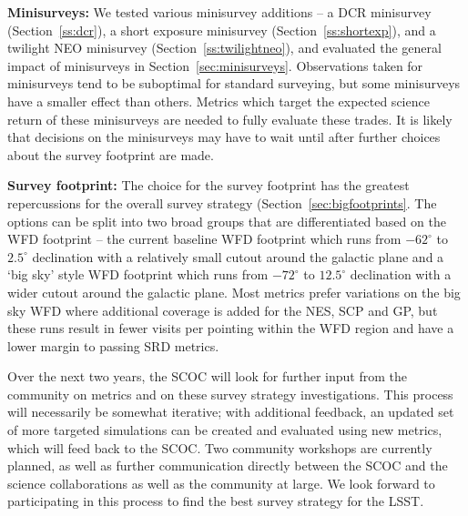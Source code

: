{\bf Minisurveys:} We tested various minisurvey additions -- a DCR minisurvey (Section~\ref{ss:dcr}), a short exposure minisurvey (Section~\ref{ss:shortexp}), and a twilight NEO minisurvey (Section~\ref{ss:twilightneo}), and evaluated the general impact of minisurveys in Section~\ref{sec:minisurveys}. Observations taken for minisurveys tend to be suboptimal for standard surveying, but some minisurveys have a smaller effect than others. Metrics which target the expected science return of these minisurveys are needed to fully evaluate these trades. It is likely that decisions on the minisurveys may have to wait until after further choices about the survey footprint are made.

{\bf Survey footprint:} The choice for the survey footprint has the greatest repercussions for the overall survey strategy (Section~\ref{sec:bigfootprints}. The options can be split into two broad groups that are differentiated based on the WFD footprint -- the current baseline WFD footprint which runs from $-62^\circ$ to $2.5^\circ$ declination with a relatively small cutout around the galactic plane and a `big sky' style WFD footprint which runs from  $-72^\circ$ to $12.5^\circ$ declination with a wider cutout around the galactic plane. Most metrics prefer variations on the big sky WFD where additional coverage is added for the NES, SCP and GP, but these runs result in fewer visits per pointing within the WFD region and have a lower margin to passing SRD metrics. 

Over the next two years, the SCOC will look for further input from the community on metrics and on these survey strategy investigations. This process will necessarily be somewhat iterative; with additional feedback, an updated set of more targeted simulations can be created and evaluated using new metrics, which will feed back to the SCOC. Two community workshops are currently planned, as well as further communication directly between the SCOC and the science collaborations as well as the community at large. We look forward to participating in this process to find the best survey strategy for the LSST.

